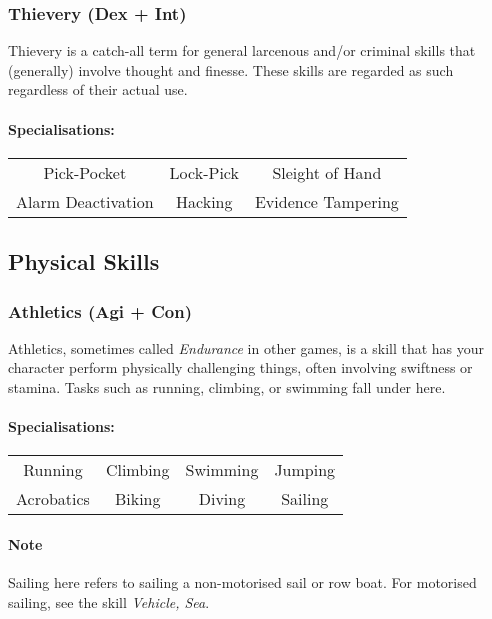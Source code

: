 \subsubsection{Thievery (Dex + Int)}
Thievery is a catch-all term for general larcenous and/or criminal skills that (generally) involve thought and finesse.
These skills are regarded as such regardless of their actual use.

\paragraph{Specialisations:}
\begin{center}
    \begin{tabular}{c|c|c}
        Pick-Pocket & Lock-Pick & Sleight of Hand \\
        Alarm Deactivation & Hacking & Evidence Tampering \\
    \end{tabular}
\end{center}

\subsection{Physical Skills}
\subsubsection{Athletics (Agi + Con)}
Athletics, sometimes called \textit{Endurance} in other games, is a skill that has your character perform physically challenging things, often involving swiftness or stamina.
Tasks such as running, climbing, or swimming fall under here.

\paragraph{Specialisations:}
\begin{center}
    \begin{tabular}{c|c|c|c}
        Running & Climbing & Swimming & Jumping \\
        Acrobatics & Biking & Diving & Sailing \\
    \end{tabular}
\end{center}

\paragraph{Note} Sailing here refers to sailing a non-motorised sail or row boat. For motorised sailing, see the skill \textit{Vehicle, Sea}.

